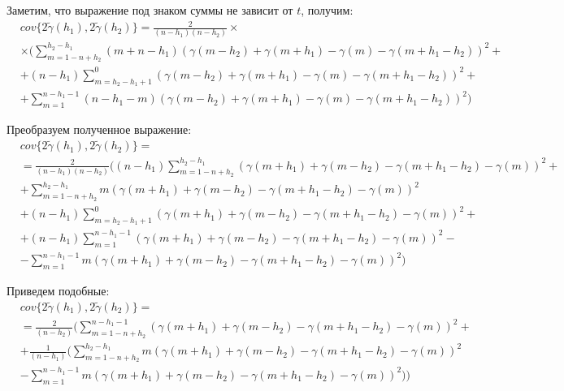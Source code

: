 Заметим, что выражение под знаком суммы не зависит от $t$, получим:
\begin{eqnarray*}
\nonumber
	& cov\{ 2 \tilde{\gamma}(h_1), 2 \tilde{\gamma}(h_2) \} = \frac{2}{(n - h_1) (n - h_2)} \times \\
	& \times (\sum_{m = 1 - n + h_2}^{h_2 - h_1}(m + n - h_1)(\gamma(m - h_2) + \gamma(m + h_1) - \gamma(m) - \gamma(m + h_1 - h_2))^2 + \\
	& + (n - h_1)\sum_{m = h_2 - h_1 + 1}^{0}(\gamma(m - h_2) + \gamma(m + h_1) - \gamma(m) - \gamma(m + h_1 - h_2))^2 + \\
	& + \sum_{m = 1}^{n - h_1 - 1}(n - h_1 - m)(\gamma(m - h_2) + \gamma(m + h_1) - \gamma(m) - \gamma(m + h_1 - h_2))^2)
\end{eqnarray*}

Преобразуем полученное выражение:
\begin{eqnarray*}
\nonumber
	& cov\{ 2 \tilde{\gamma}(h_1), 2 \tilde{\gamma}(h_2) \} = \\
	& = \frac{2}{(n - h_1)(n - h_2)} ((n - h_1)\sum_{m = 1 - n + h_2}^{h_2 - h_1}(\gamma(m + h_1) + \gamma(m - h_2) - \gamma(m + h_1 - h_2) - \gamma(m))^2 + \\
	& + \sum_{m = 1 - n + h_2}^{h_2 - h_1} m (\gamma(m + h_1) + \gamma(m - h_2) - \gamma(m + h_1 - h_2) - \gamma(m))^2 \\
	& + (n - h_1)\sum_{m = h_2 - h_1 + 1}^{0} (\gamma(m + h_1) + \gamma(m - h_2) - \gamma(m + h_1 - h_2) - \gamma(m))^2 + \\
	& + (n - h_1)\sum_{m = 1}^{n - h_1 - 1} (\gamma(m + h_1) + \gamma(m - h_2) - \gamma(m + h_1 - h_2) - \gamma(m))^2 - \\
	& - \sum_{m = 1}^{n - h_1 - 1} m (\gamma(m + h_1) + \gamma(m - h_2) - \gamma(m + h_1 - h_2) - \gamma(m))^2)
\end{eqnarray*}

Приведем подобные:
\begin{eqnarray*}
\nonumber
	& cov\{ 2 \tilde{\gamma}(h_1), 2 \tilde{\gamma}(h_2) \} = \\
	& = \frac{2}{(n - h_2)} ( \sum_{m = 1 - n + h_2}^{n - h_1 - 1}(\gamma(m + h_1) + \gamma(m - h_2) - \gamma(m + h_1 - h_2) - \gamma(m))^2 + \\
	& + \frac{1}{(n - h_1)} ( \sum_{m = 1 - n + h_2}^{h_2 - h_1} m (\gamma(m + h_1) + \gamma(m - h_2) - \gamma(m + h_1 - h_2) - \gamma(m))^2 \\
	& - \sum_{m = 1}^{n - h_1 - 1} m (\gamma(m + h_1) + \gamma(m - h_2) - \gamma(m + h_1 - h_2) - \gamma(m))^2 ) )
\end{eqnarray*}

